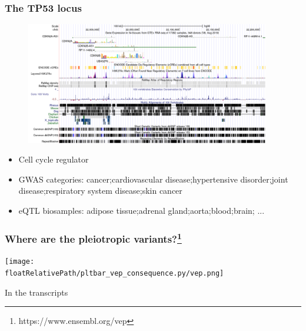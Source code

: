 \documentclass{beamer}
\newcommand*{\floatRelativePath}{../out/gwas417/pval_5e-08/r2_0.1/kb_1000/window_1000000/75_50}%
\begin{document}
    \begin{frame}
        \frametitle{The TP53 locus}

        \begin{figure}[!]
            \includegraphics[width=0.95\textwidth]{fig/cdk2na}
        \end{figure}

        \begin{itemize}
            \item Cell cycle regulator
            \item GWAS categories: cancer;cardiovascular disease;hypertensive disorder;joint disease;respiratory system disease;skin cancer
            \item eQTL biosamples: adipose tissue;adrenal gland;aorta;blood;brain; ...
        \end{itemize}

    \end{frame}

    \begin{frame}
        \frametitle{Where are the pleiotropic variants?\footnote{https://www.ensembl.org/vep}}

        \begin{center}
            \texttt{[image: \\floatRelativePath/pltbar\_vep\_consequence.py/vep.png]}
        \end{center}

        In the transcripts


    \end{frame}
\end{document}
